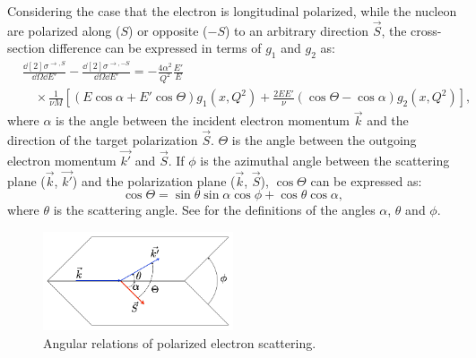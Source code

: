 Considering the case that the electron is longitudinal polarized, while the nucleon are polarized along ($S$) or opposite ($-S$) to an arbitrary direction $\vec{S}$, the cross-section difference can be expressed in terms of $g_1$ and $g_2$ as:
\begin{equation} \label{C2S2E23}
\begin{split}
& \frac{\dd[2]{\sigma}^{\rightarrow,S}}{\dd{\Omega}\dd{E'}}-\frac{\dd[2]{\sigma}^{\rightarrow,-S}}{\dd{\Omega}\dd{E'}} = -\frac{4\alpha^2}{Q^2}\frac{E'}{E} \\
& \quad \times\frac{1}{\nu M}\left[(E\cos\alpha+E'\cos\Theta)g_1(x,Q^2)+\frac{2EE'}{\nu}(\cos\Theta-\cos\alpha)g_2(x,Q^2)\right],
\end{split}
\end{equation}
where $\alpha$ is the angle between the incident electron momentum $\vec{k}$ and the direction of the target polarization $\vec{S}$. $\Theta$ is the angle between the outgoing electron momentum $\vec{k'}$ and $\vec{S}$. If $\phi$ is the azimuthal angle between the scattering plane ($\vec{k}$, $\vec{k'}$) and the polarization plane ($\vec{k}$, $\vec{S}$), $\cos\Theta$ can be expressed as:
\begin{equation} \label{C2S2E24}
\cos\Theta = \sin\theta\sin\alpha\cos\phi+\cos\theta\cos\alpha,
\end{equation}
where $\theta$ is the scattering angle. See  for the definitions of the angles $\alpha$, $\theta$ and $\phi$.

\begin{figure}[tb!]
  \centering
  \includegraphics[width=0.5\textwidth]{figs/angles-of-polarized-scattering.png}
  \caption[Angular relations of polarized electron scattering.]{Angular relations of polarized electron scattering. \label{C2S2F1}}
\end{figure}

